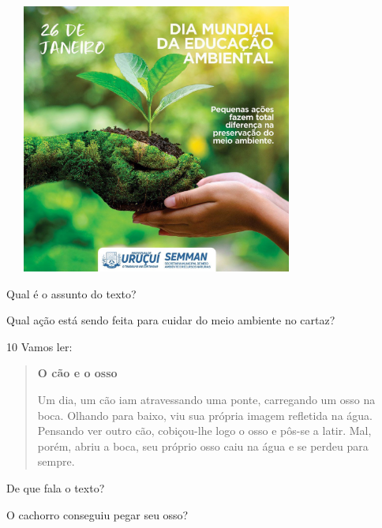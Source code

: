 \includegraphics[width=3.96154in,height=3.50028in]{media/image123.jpeg}


\begin{escolha}
\item Qual é o assunto do texto?


\item Qual ação está sendo feita para cuidar do meio ambiente no cartaz?

\end{escolha}

\num{10} Vamos ler:

\begin{quote}
\textbf{O cão e o osso}

Um dia, um cão iam atravessando uma ponte, carregando um osso na boca.
Olhando para baixo, viu sua própria imagem refletida
na água. Pensando ver outro cão, cobiçou-lhe logo o osso e
pôs-se a latir. Mal, porém, abriu a boca, seu próprio osso caiu
na água e se perdeu para sempre.
\end{quote}


\begin{escolha}
\item De que fala o texto?


\item O cachorro conseguiu pegar seu osso?

\end{escolha}

